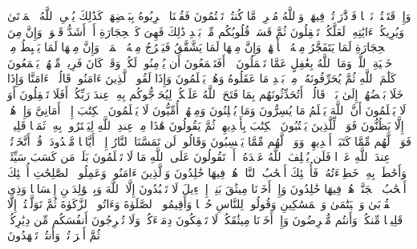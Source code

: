 \stopbuffer%
\startbuffer[\q:2:72]
وَإِذۡ قَتَلۡتُمۡ نَفۡسࣰا فَٱدَّٰرَءۡتُمۡ فِیهَاۖ وَٱللَّهُ مُخۡرِجࣱ مَّا كُنتُمۡ تَكۡتُمُونَ%
\stopbuffer%
\startbuffer[\q:2:73]
فَقُلۡنَا ٱضۡرِبُوهُ بِبَعۡضِهَاۚ كَذَٰلِكَ یُحۡیِ ٱللَّهُ ٱلۡمَوۡتَىٰ وَیُرِیكُمۡ ءَایَٰتِهِۦ لَعَلَّكُمۡ تَعۡقِلُونَ%
\stopbuffer%
\startbuffer[\q:2:74]
ثُمَّ قَسَتۡ قُلُوبُكُم مِّنۢ بَعۡدِ ذَٰلِكَ فَهِیَ كَٱلۡحِجَارَةِ أَوۡ أَشَدُّ قَسۡوَةࣰۚ وَإِنَّ مِنَ ٱلۡحِجَارَةِ لَمَا یَتَفَجَّرُ مِنۡهُ ٱلۡأَنۡهَٰرُۚ وَإِنَّ مِنۡهَا لَمَا یَشَّقَّقُ فَیَخۡرُجُ مِنۡهُ ٱلۡمَاۤءُۚ وَإِنَّ مِنۡهَا لَمَا یَهۡبِطُ مِنۡ خَشۡیَةِ ٱللَّهِۗ وَمَا ٱللَّهُ بِغَٰفِلٍ عَمَّا تَعۡمَلُونَ%
\stopbuffer%
\startbuffer[\q:2:75]
۞ أَفَتَطۡمَعُونَ أَن یُؤۡمِنُوا۟ لَكُمۡ وَقَدۡ كَانَ فَرِیقࣱ مِّنۡهُمۡ یَسۡمَعُونَ كَلَٰمَ ٱللَّهِ ثُمَّ یُحَرِّفُونَهُۥ مِنۢ بَعۡدِ مَا عَقَلُوهُ وَهُمۡ یَعۡلَمُونَ%
\stopbuffer%
\startbuffer[\q:2:76]
وَإِذَا لَقُوا۟ ٱلَّذِینَ ءَامَنُوا۟ قَالُوۤا۟ ءَامَنَّا وَإِذَا خَلَا بَعۡضُهُمۡ إِلَىٰ بَعۡضࣲ قَالُوۤا۟ أَتُحَدِّثُونَهُم بِمَا فَتَحَ ٱللَّهُ عَلَیۡكُمۡ لِیُحَاۤجُّوكُم بِهِۦ عِندَ رَبِّكُمۡۚ أَفَلَا تَعۡقِلُونَ%
\stopbuffer%
\startbuffer[\q:2:77]
أَوَ لَا یَعۡلَمُونَ أَنَّ ٱللَّهَ یَعۡلَمُ مَا یُسِرُّونَ وَمَا یُعۡلِنُونَ%
\stopbuffer%
\startbuffer[\q:2:78]
وَمِنۡهُمۡ أُمِّیُّونَ لَا یَعۡلَمُونَ ٱلۡكِتَٰبَ إِلَّاۤ أَمَانِیَّ وَإِنۡ هُمۡ إِلَّا یَظُنُّونَ%
\stopbuffer%
\startbuffer[\q:2:79]
فَوَیۡلࣱ لِّلَّذِینَ یَكۡتُبُونَ ٱلۡكِتَٰبَ بِأَیۡدِیهِمۡ ثُمَّ یَقُولُونَ هَٰذَا مِنۡ عِندِ ٱللَّهِ لِیَشۡتَرُوا۟ بِهِۦ ثَمَنࣰا قَلِیلࣰاۖ فَوَیۡلࣱ لَّهُم مِّمَّا كَتَبَتۡ أَیۡدِیهِمۡ وَوَیۡلࣱ لَّهُم مِّمَّا یَكۡسِبُونَ%
\stopbuffer%
\startbuffer[\q:2:80]
وَقَالُوا۟ لَن تَمَسَّنَا ٱلنَّارُ إِلَّاۤ أَیَّامࣰا مَّعۡدُودَةࣰۚ قُلۡ أَتَّخَذۡتُمۡ عِندَ ٱللَّهِ عَهۡدࣰا فَلَن یُخۡلِفَ ٱللَّهُ عَهۡدَهُۥۤۖ أَمۡ تَقُولُونَ عَلَى ٱللَّهِ مَا لَا تَعۡلَمُونَ%
\stopbuffer%
\startbuffer[\q:2:81]
بَلَىٰۚ مَن كَسَبَ سَیِّئَةࣰ وَأَحَٰطَتۡ بِهِۦ خَطِیۤءَتُهُۥ فَأُو۟لَٰۤئِكَ أَصۡحَٰبُ ٱلنَّارِۖ هُمۡ فِیهَا خَٰلِدُونَ%
\stopbuffer%
\startbuffer[\q:2:82]
وَٱلَّذِینَ ءَامَنُوا۟ وَعَمِلُوا۟ ٱلصَّٰلِحَٰتِ أُو۟لَٰۤئِكَ أَصۡحَٰبُ ٱلۡجَنَّةِۖ هُمۡ فِیهَا خَٰلِدُونَ%
\stopbuffer%
\startbuffer[\q:2:83]
وَإِذۡ أَخَذۡنَا مِیثَٰقَ بَنِیۤ إِسۡرَٰۤءِیلَ لَا تَعۡبُدُونَ إِلَّا ٱللَّهَ وَبِٱلۡوَٰلِدَیۡنِ إِحۡسَانࣰا وَذِی ٱلۡقُرۡبَىٰ وَٱلۡیَتَٰمَىٰ وَٱلۡمَسَٰكِینِ وَقُولُوا۟ لِلنَّاسِ حُسۡنࣰا وَأَقِیمُوا۟ ٱلصَّلَوٰةَ وَءَاتُوا۟ ٱلزَّكَوٰةَ ثُمَّ تَوَلَّیۡتُمۡ إِلَّا قَلِیلࣰا مِّنكُمۡ وَأَنتُم مُّعۡرِضُونَ%
\stopbuffer%
\startbuffer[\q:2:84]
وَإِذۡ أَخَذۡنَا مِیثَٰقَكُمۡ لَا تَسۡفِكُونَ دِمَاۤءَكُمۡ وَلَا تُخۡرِجُونَ أَنفُسَكُم مِّن دِیَٰرِكُمۡ ثُمَّ أَقۡرَرۡتُمۡ وَأَنتُمۡ تَشۡهَدُونَ%
